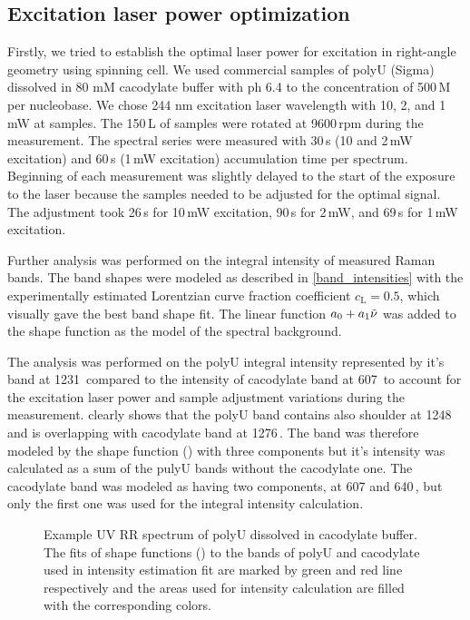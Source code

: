 \subsection{Excitation laser power optimization}

Firstly, we tried to establish the optimal laser power for excitation in
right-angle geometry using spinning cell. We used commercial samples of polyU
(Sigma) dissolved in 80 mM cacodylate buffer with ph 6.4 to the concentration
of 500\,M per nucleobase. We chose 244 nm excitation laser wavelength with
10, 2, and 1 mW at samples. The 150\,L of samples were rotated at
9600\,rpm during the measurement. The spectral series were measured with 30\,s
(10 and 2\,mW excitation) and 60\,s (1\,mW excitation) accumulation time per
spectrum. Beginning of each measurement was slightly delayed to the start of
the exposure to the laser because the samples needed to be adjusted for the
optimal signal. The adjustment took 26\,s for 10\,mW excitation, 90\,s for
2\,mW, and 69\,s for 1\,mW excitation.

Further analysis was performed on the integral intensity of measured Raman
bands. The band shapes were modeled as described in
\cref{band_intensities}
with the experimentally estimated Lorentzian curve fraction coefficient
$c_\text{L} = 0.5$, which visually gave the best band shape fit. The
linear function $a_0 + a_1\tilde{\nu}$ was added to the shape function
as the model of the spectral background.

The analysis was performed on the polyU integral intensity represented by
it's band at 1231\,\icm{} compared to the intensity of cacodylate band at
607\,\icm{} to account for the excitation laser power and sample adjustment
variations during the measurement.
clearly shows that the polyU band contains also shoulder at 1248\,\icm{} and
is overlapping with cacodylate band at 1276\,\icm. The band was therefore
modeled by the shape function
()
with three components but it's intensity was calculated as a sum of the pulyU
bands without the cacodylate one. The cacodylate band was modeled as having
two components, at 607 and 640\,\icm, but only the first one was used for the
integral intensity calculation.

\begin{figure}
	\centering
	
	\caption{Example UV RR spectrum of polyU dissolved in cacodylate buffer. The
		fits of shape functions () to the bands of
		polyU and cacodylate used in intensity estimation fit are marked by green
		and red line respectively and the areas used for intensity calculation are
		filled with the corresponding colors.}
	\label{\figlabel{power_optim:triplexes_pU}}
\end{figure}

